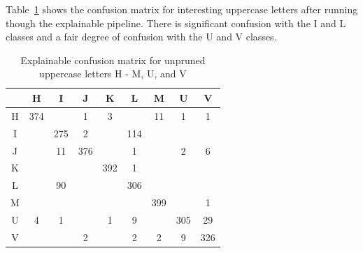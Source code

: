 \documentclass[conference]{IEEEtran}
\begin{document}
\begin{table}
    \centering
    \caption{\label{tab_explainable accuracy_results}Explainable accuracy results on various balanced EMNIST data sets with differing NN models}
\end{table}

Table~\ref{raw_cap_confusion_matrix} shows the confusion matrix for interesting
uppercase letters after running though the explainable pipeline. There is
significant confusion with the I and L classes and a fair degree of confusion
with the U and V classes.


\begin{table}
    \centering
    \begin{tabular}{ |c|c|c|c|c|c|c|c|c|}
    \hline
     & H & I & J & K & L & M & U & V \\
    \hline
    H & 374 &  & 1 & 3 &  & 11 & 1 & 1 \\
    \hline
    I &  & 275 & 2 & & 114 & & & \\
    \hline
    J &  & 11 & 376 & & 1 & & 2 & 6 \\
    \hline
    K &  &  &  & 392 & 1 & & & \\
    \hline
    L &  & 90 &  &  & 306 & & & \\
    \hline
    M &  &  &  &  &  & 399 & & 1 \\
    \hline
    U & 4 & 1 & & 1 & 9 & & 305 & 29 \\
    \hline
    V & & & 2 & & 2 & 2 & 9 & 326 \\
    \hline
    \end{tabular}
    \caption{\label{raw_cap_confusion_matrix}Explainable confusion matrix for unpruned uppercase letters H - M, U, and V}
\end{table}
\end{document}
